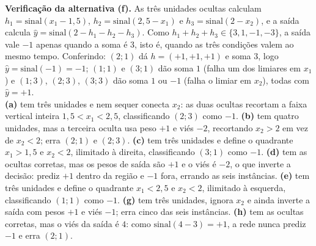 \documentclass[11pt,a4paper]{article}
\begin{document}
\textbf{Verificação da alternativa (f).} As três unidades ocultas calculam $h_1 = \mathrm{sinal}(x_1 - 1{,}5)$, $h_2 = \mathrm{sinal}(2{,}5 - x_1)$ e $h_3 = \mathrm{sinal}(2 - x_2)$, e a saída calcula $\hat{y} = \mathrm{sinal}(2 - h_1 - h_2 - h_3)$. Como $h_1 + h_2 + h_3 \in \{3, 1, -1, -3\}$, a saída vale $-1$ apenas quando a soma é $3$, isto é, quando as três condições valem ao mesmo tempo. Conferindo: $(2;1)$ dá $h = (+1, +1, +1)$ e soma $3$, logo $\hat{y} = \mathrm{sinal}(-1) = -1$; $(1;1)$ e $(3;1)$ dão soma $1$ (falha um dos limiares em $x_1$) e $(1;3)$, $(2;3)$, $(3;3)$ dão soma $1$ ou $-1$ (falha o limiar em $x_2$), todas com $\hat{y} = +1$.\\
\textbf{(a)} tem três unidades e nem sequer conecta $x_2$: as duas ocultas recortam a faixa vertical inteira $1{,}5 < x_1 < 2{,}5$, classificando $(2;3)$ como $-1$.
\textbf{(b)} tem quatro unidades, mas a terceira oculta usa peso $+1$ e viés $-2$, recortando $x_2 > 2$ em vez de $x_2 < 2$; erra $(2;1)$ e $(2;3)$.
\textbf{(c)} tem três unidades e define o quadrante $x_1 > 1{,}5$ e $x_2 < 2$, ilimitado à direita, classificando $(3;1)$ como $-1$.
\textbf{(d)} tem as ocultas corretas, mas os pesos de saída são $+1$ e o viés é $-2$, o que inverte a decisão: prediz $+1$ dentro da região e $-1$ fora, errando as seis instâncias.
\textbf{(e)} tem três unidades e define o quadrante $x_1 < 2{,}5$ e $x_2 < 2$, ilimitado à esquerda, classificando $(1;1)$ como $-1$.
\textbf{(g)} tem três unidades, ignora $x_2$ e ainda inverte a saída com pesos $+1$ e viés $-1$; erra cinco das seis instâncias.
\textbf{(h)} tem as ocultas corretas, mas o viés da saída é $4$: como $\mathrm{sinal}(4 - 3) = +1$, a rede nunca prediz $-1$ e erra $(2;1)$.
\end{document}

